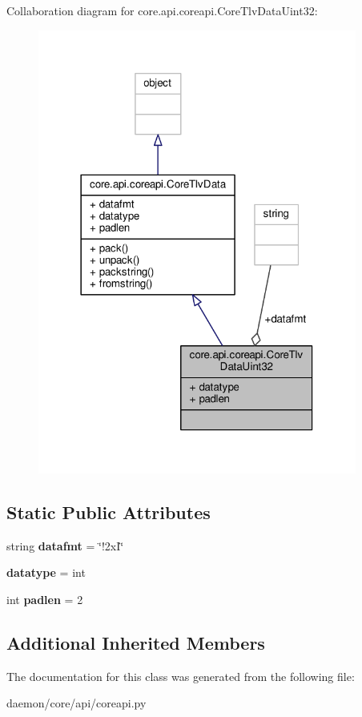 Collaboration diagram for core.\+api.\+coreapi.\+Core\+Tlv\+Data\+Uint32\+:
\nopagebreak
\begin{figure}[H]
\begin{center}
\leavevmode
\includegraphics[width=297pt]{classcore_1_1api_1_1coreapi_1_1_core_tlv_data_uint32__coll__graph}
\end{center}
\end{figure}
\subsection*{Static Public Attributes}
\begin{DoxyCompactItemize}
\item 
\hypertarget{classcore_1_1api_1_1coreapi_1_1_core_tlv_data_uint32_aa90e26c80fcb03df27d57aea6ce450c9}{string {\bfseries datafmt} = \char`\"{}!2x\+I\char`\"{}}\label{classcore_1_1api_1_1coreapi_1_1_core_tlv_data_uint32_aa90e26c80fcb03df27d57aea6ce450c9}

\item 
\hypertarget{classcore_1_1api_1_1coreapi_1_1_core_tlv_data_uint32_ae9f52f089fdf2da0eb2ecd4013d50730}{{\bfseries datatype} = int}\label{classcore_1_1api_1_1coreapi_1_1_core_tlv_data_uint32_ae9f52f089fdf2da0eb2ecd4013d50730}

\item 
\hypertarget{classcore_1_1api_1_1coreapi_1_1_core_tlv_data_uint32_a50b9c5c9d91dcc9c7c0beb39c37dceed}{int {\bfseries padlen} = 2}\label{classcore_1_1api_1_1coreapi_1_1_core_tlv_data_uint32_a50b9c5c9d91dcc9c7c0beb39c37dceed}

\end{DoxyCompactItemize}
\subsection*{Additional Inherited Members}


The documentation for this class was generated from the following file\+:\begin{DoxyCompactItemize}
\item 
daemon/core/api/coreapi.\+py\end{DoxyCompactItemize}
